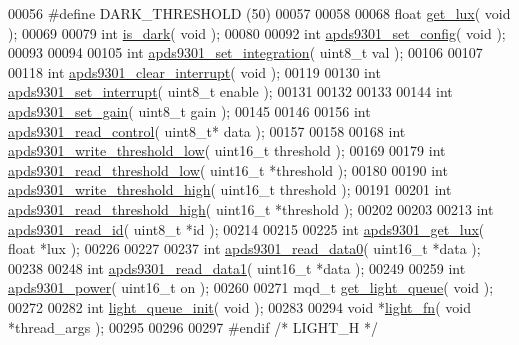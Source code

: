 \begin{DoxyCode}
00056 \textcolor{preprocessor}{#define DARK\_THRESHOLD           (50)}
00057 
00058 
00068 \textcolor{keywordtype}{float} \hyperlink{light_8h_a7f1c59e171c9db2a7609a4cd8b61fa2c}{get\_lux}( \textcolor{keywordtype}{void} );
00069 
00079 \textcolor{keywordtype}{int} \hyperlink{light_8h_a5ba3d2c92432bf82f3f3cc4e809b1dba}{is\_dark}( \textcolor{keywordtype}{void} );
00080 
00092 \textcolor{keywordtype}{int} \hyperlink{light_8h_ac3c04aef00858dc27815e190f8186cfd}{apds9301\_set\_config}( \textcolor{keywordtype}{void} );
00093 
00094 
00105 \textcolor{keywordtype}{int} \hyperlink{light_8h_a99e9814d23261d099bf5d381d84d6642}{apds9301\_set\_integration}( uint8\_t val );
00106 
00107 
00118 \textcolor{keywordtype}{int} \hyperlink{light_8h_a145d5bf45a3d1527eaa860a2a4ce545b}{apds9301\_clear\_interrupt}( \textcolor{keywordtype}{void} );
00119 
00130 \textcolor{keywordtype}{int} \hyperlink{light_8h_a3b06e19e8c55d93415a41352cf11de16}{apds9301\_set\_interrupt}( uint8\_t enable );
00131 
00132 
00133 
00144 \textcolor{keywordtype}{int} \hyperlink{light_8h_a3063fd5cfc043ce2ac7c67f8af9b4b2e}{apds9301\_set\_gain}( uint8\_t gain );
00145 
00146 
00156 \textcolor{keywordtype}{int} \hyperlink{light_8h_a8e844b99f75ecdf6712faaaddc0eb396}{apds9301\_read\_control}( uint8\_t* data );
00157 
00158 
00168 \textcolor{keywordtype}{int} \hyperlink{light_8h_ae2c85da2e138447c5881122669c36a38}{apds9301\_write\_threshold\_low}( uint16\_t threshold );
00169 
00179 \textcolor{keywordtype}{int} \hyperlink{light_8h_a67500fb59f0ab2f2e46c3b6f945985b5}{apds9301\_read\_threshold\_low}( uint16\_t *threshold );
00180 
00190 \textcolor{keywordtype}{int} \hyperlink{light_8h_adb39e9954b4d948edea845453df2abf6}{apds9301\_write\_threshold\_high}( uint16\_t threshold );
00191 
00201 \textcolor{keywordtype}{int} \hyperlink{light_8h_a0005300d36508d20c372b5355d6546d9}{apds9301\_read\_threshold\_high}( uint16\_t *threshold );
00202 
00203 
00213 \textcolor{keywordtype}{int} \hyperlink{light_8h_a6dbf3801330c345b999db86f018c94cf}{apds9301\_read\_id}( uint8\_t *\textcolor{keywordtype}{id} );
00214 
00215 
00225 \textcolor{keywordtype}{int} \hyperlink{light_8h_a14680b863ba54159dba03357d4745a16}{apds9301\_get\_lux}( \textcolor{keywordtype}{float} *lux );
00226 
00227 
00237 \textcolor{keywordtype}{int} \hyperlink{light_8h_a96f9f9c1e4e86cc148aa0a334a399d8d}{apds9301\_read\_data0}( uint16\_t *data );
00238 
00248 \textcolor{keywordtype}{int} \hyperlink{light_8h_a342a83b7263a75c5b12bffc638b2797e}{apds9301\_read\_data1}( uint16\_t *data );
00249 
00259 \textcolor{keywordtype}{int} \hyperlink{light_8h_a163ea457431a4845d5ff5fa205f670b7}{apds9301\_power}( uint16\_t on );
00260 
00271 mqd\_t \hyperlink{light_8h_a57d6c7de6874cb33b372559ea24ebb85}{get\_light\_queue}( \textcolor{keywordtype}{void} );
00272 
00282 \textcolor{keywordtype}{int} \hyperlink{light_8h_abafa0fdb40560c48e4b98ec10f0e1f43}{light\_queue\_init}( \textcolor{keywordtype}{void} );
00283 
00294 \textcolor{keywordtype}{void} *\hyperlink{light_8h_a1a3ec39083c9a030ae43f0e8bd3ea71d}{light\_fn}( \textcolor{keywordtype}{void} *thread\_args );
00295 
00296 
00297 \textcolor{preprocessor}{#endif }\textcolor{comment}{/* LIGHT\_H */}\textcolor{preprocessor}{}
\end{DoxyCode}
